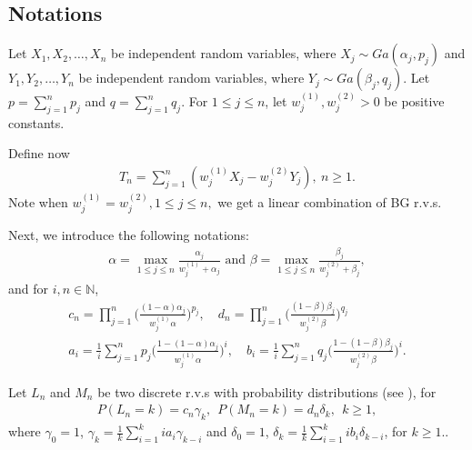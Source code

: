 \documentclass[12pt, a4paper,reqno]{amsart}
\theoremstyle{definition}
\theoremstyle{myremark}
\numberwithin{equation}{section}
\begin{document}
\subsection{Notations}\label{nota} Let $X_1,X_2,\ldots,X_n$ be independent random variables, where $X_j \sim Ga(\alpha_j,p_j)$ and $Y_1,Y_2,\ldots,Y_n$ be independent random variables, where $Y_j \sim Ga(\beta_j,q_j)$. Let $p=\sum_{j=1}^{n}p_j$ and $q=\sum_{j=1}^{n}q_j$. For $ 1 \le j \le n$, let $w_j^{(1)},w_j^{(2)}>0$ be positive constants. 


\noindent
Define now
\begin{align}\label{defTn}
	T_n= \sum_{j=1}^{n}(w_j^{(1)}X_j-w_j^{(2)}Y_j),~n\geq 1.
\end{align} 
\noindent Note when $w_j^{(1)}=w_j^{(2)},  1 \le j \le n,$ we get a linear combination of BG r.v.s.

Next, we introduce the following notations:
\begin{align}\label{ref1}
\alpha=\max_{1\leq j \leq n} \frac{\alpha_j}{w_j^{(1)}+\alpha_j} \text{ and } \beta=\max_{1\leq j \leq n} \frac{\beta_j}{w_j^{(2)}+\beta_j},
\end{align}
and for $i, n \in \mathbb{N}$,
\begin{align*}
	c_n=\prod_{j=1}^{n}\Big(  \frac{(1-\alpha)\alpha_j}{w_j^{(1)}\alpha}  \Big)^{p_j}, \quad  d_n=\prod_{j=1}^{n}\Big(  \frac{(1-\beta)\beta_j}{w_j^{(2)}\beta}  \Big)^{q_j} \\
	a_i=\frac{1}{i}\sum_{j=1}^{n}p_j\Big(\frac{1-(1-\alpha)\alpha_j}{w_j^{(1)}\alpha} \Big)^i, \quad   b_i=\frac{1}{i}\sum_{j=1}^{n}q_j\Big(\frac{1-(1-\beta)\beta_j}{w_j^{(2)}\beta} \Big)^i. 
\end{align*}


 Let $L_n$ and $M_n$ be two discrete r.v.s with probability distributions (see \cite{pvns2009}), for 
\begin{align}\label{ref2}
P(L_n=k)=c_n\gamma_k,~~  P(M_n=k)=d_n\delta_k, ~~k \ge 1,
\end{align}
 where $\gamma_0=1$, $\gamma_k=\frac{1}{k}\sum_{i=1}^{k}ia_i\gamma_{k-i}$ and $\delta_0=1$, $\delta_k=\frac{1}{k}\sum_{i=1}^{k}ib_i\delta_{k-i}$, for $k \ge 1.$. 


 
  
\end{document}
